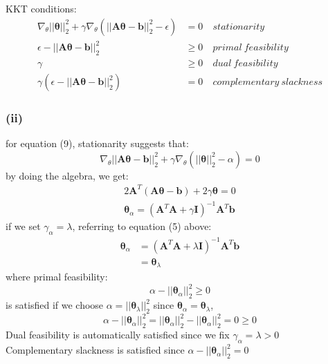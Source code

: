 \documentclass[11pt]{article}
\begin{document}
KKT conditions:\\
\begin{equation}
\begin{aligned}
\nabla_\theta||\pmb{\theta}||^2_2+\gamma\nabla_\theta(||\pmb{A\theta}-\pmb{b}||^2_2-\epsilon)&=0 &\ stationarity\\
\epsilon-||\pmb{A\theta}-\pmb{b}||^2_2&\ge 0 &\ primal\ feasibility\\
\gamma&\ge 0 &\ dual\ feasibility\\
\gamma(\epsilon-||\pmb{A\theta}-\pmb{b}||^2_2)&=0 &\ complementary\ slackness
\end{aligned}
\end{equation}

\subsubsection*{(ii)}
for equation (9), stationarity suggests that:
\begin{equation}
\nabla_\theta||\pmb{A\theta}-\pmb{b}||^2_2+\gamma\nabla_\theta(||\pmb{\theta}||^2_2-\alpha)=0
\end{equation}
by doing the algebra, we get:
\begin{equation}
\begin{split}
2\pmb{A}^T(\pmb{A\theta}-\pmb{b})+2\gamma\pmb{\theta}=0\\
\pmb{\theta}_\alpha=(\pmb{A}^T\pmb{A}+\gamma\pmb{I})^{-1}\pmb{A}^T\pmb{b}
\end{split}
\end{equation}
if we set $\gamma_\alpha=\lambda$, referring to equation (5) above:\\
\begin{equation}
\begin{split}
\pmb{\theta}_\alpha&=(\pmb{A}^T\pmb{A}+\lambda\pmb{I})^{-1}\pmb{A}^T\pmb{b}\\
&=\pmb{\theta}_\lambda
\end{split}
\end{equation}
where primal feasibility:
$$\alpha-||\pmb{\theta}_\alpha||^2_2\ge 0$$
is satisfied if we choose $\alpha = ||\pmb{\theta}_\lambda||^2_2$ since $\pmb{\theta}_\alpha = \pmb{\theta}_\lambda$,\\
	$$\alpha-||\pmb{\theta}_\alpha||^2_2=||\pmb{\theta}_\alpha||^2_2-||\pmb{\theta}_\alpha||^2_2=0\ge0$$
Dual feasibility is automatically satisfied since we fix $\gamma_\alpha=\lambda>0$\\
Complementary slackness is satisfied since 	$\alpha-||\pmb{\theta}_\alpha||^2_2=0$\\
\end{document}
